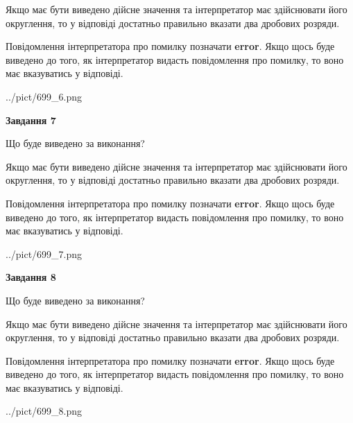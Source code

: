 \documentclass[12pt, ukrainian]{article}
\begin{document}
{\begin {Large}
Якщо має бути виведено дійсне значення та інтерпретатор має здійснювати його округлення, 
то у відповіді достатньо правильно вказати два дробових розряди.

Повідомлення інтерпретатора про помилку позначати \textbf{error}.
Якщо щось буде виведено до того, як інтерпретатор видасть повідомлення про помилку, 
то воно має вказуватись у відповіді. \par

\begin{center}
	{../pict/699_6.png}
\end{center}
\newpage

{\begin {center}\textbf{Завдання 7}\end {center}}\par
Що буде виведено за виконання? \par

Якщо має бути виведено дійсне значення та інтерпретатор має здійснювати його округлення, 
то у відповіді достатньо правильно вказати два дробових розряди.

Повідомлення інтерпретатора про помилку позначати \textbf{error}.
Якщо щось буде виведено до того, як інтерпретатор видасть повідомлення про помилку, 
то воно має вказуватись у відповіді. \par

\begin{center}
	{../pict/699_7.png}
\end{center}
\newpage

{\begin {center}\textbf{Завдання 8}\end {center}}\par
Що буде виведено за виконання? \par

Якщо має бути виведено дійсне значення та інтерпретатор має здійснювати його округлення, 
то у відповіді достатньо правильно вказати два дробових розряди.

Повідомлення інтерпретатора про помилку позначати \textbf{error}.
Якщо щось буде виведено до того, як інтерпретатор видасть повідомлення про помилку, 
то воно має вказуватись у відповіді. \par

\begin{center}
	{../pict/699_8.png}
\end{center}
\newpage


\end{Large}}
\end{document}
